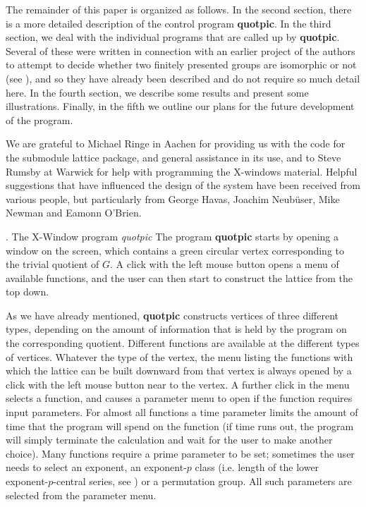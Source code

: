 The remainder of this paper is organized as follows. In the second section,
there is a more detailed description of the control program {\bf quotpic}. In
the third section, we deal with the individual programs that are called up
by {\bf quotpic}. Several of these were written in connection with an earlier
project of the authors to attempt to decide whether two finitely presented
groups are isomorphic or not (see \cite{7}), and so they have already been
described and do not require so much detail here. In the fourth
section, we describe some results and present some illustrations.
Finally, in the fifth we outline our plans for the future development of the
program.

We are grateful to Michael Ringe in Aachen for providing us with the code
for the submodule lattice package, and general assistance in its use,
and to Steve Rumsby at Warwick for help with programming the X-windows material.
Helpful suggestions that have influenced the design of the system have been
received from various people, but particularly from
George Havas, Joachim Neub\"{u}ser, Mike Newman and Eamonn O'Brien.

. The X-Window program {\it quotpic}                %
\endhead                             %
The program {\bf quotpic} starts by opening a window on the screen, which contains a
green circular vertex corresponding to the trivial quotient of $G$. A click
with the left mouse button opens a menu of available functions, and the user 
can then start to  construct the lattice from the top down.

As we have already mentioned, {\bf quotpic} constructs vertices of three 
different 
types, depending on the amount of information that is held by the program on 
the corresponding quotient. Different functions are available at the different 
types of vertices. Whatever the type of the vertex, the menu listing the 
functions with which the lattice can be built downward from that vertex is
always opened by a click with the left mouse button near to the vertex. A 
further click in the menu selects a function, and  causes a parameter menu to
open if the function requires input parameters. For almost all functions a 
time parameter limits the amount of time that the program will spend on the 
function (if time runs out, the program will simply terminate the calculation
and wait for the user to make another choice). Many functions require
a prime parameter to be set; sometimes the user needs to select an exponent,
an exponent-$p$ class (i.e. length of the lower exponent-$p$-central series, see
\cite{3}) or a permutation group. All such parameters are selected from
the parameter menu. 

